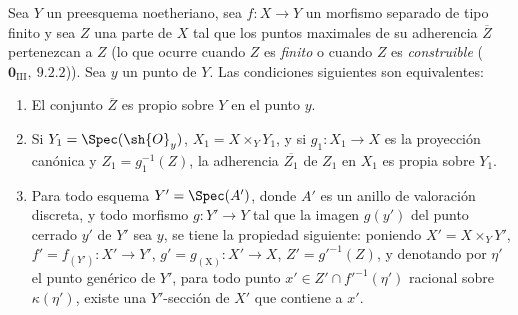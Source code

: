 \begin{corollary}[15.7.4]
\label{IV.15.7.4}
Sea $Y$ un preesquema noetheriano, sea $f:X\to Y$ un morfismo separado de tipo finito y sea $Z$ una parte de $X$ tal que los puntos maximales de su adherencia $\overline{Z}$ pertenezcan a $Z$ \textup{(lo que ocurre cuando $Z$ es \emph{finito} o cuando $Z$ es \emph{construible} ($\mathbf{0}_{\mathrm{III}},~9.2.2$))}.
Sea $y$ un punto de $Y$.
Las condiciones siguientes son equivalentes:
\begin{enumerate}[label=\emph{\alph*)}]
  \item El conjunto $\overline{Z}$ es propio sobre $Y$ en el punto $y$.
  \item Si $Y_1=\Spec(\sh{O}_y)$, $X_1=X\times_Y Y_1$, y si $g_1:X_1\to X$ es la proyección canónica y $Z_1=g_1^{-1}(Z)$, la adherencia $\overline{Z_1}$ de $Z_1$ en $X_1$ es propia sobre $Y_1$.
  \item Para todo esquema $Y'=\Spec(A')$, donde $A'$ es un anillo de valoración discreta, y todo morfismo $g:Y'\to Y$ tal que la imagen $g(y')$ del punto cerrado $y'$ de $Y'$ sea $y$, se tiene la propiedad siguiente: poniendo $X'=X\times_Y Y'$, $f'=f_{(Y')}:X'\to Y'$, $g'=g_{(\mathrm{X})}:X'\to X$, $Z'=g'^{-1}(Z)$, y denotando por $\eta'$
el punto genérico de $Y'$, para todo punto $x'\in Z'\cap f'^{-1}(\eta')$ racional sobre $\kappa(\eta')$, existe una $Y'$-sección de $X'$ que contiene a $x'$.
\end{enumerate}
\end{corollary}

